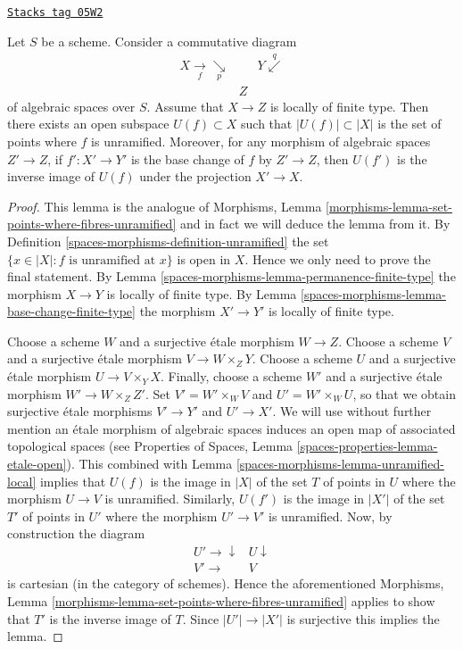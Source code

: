 \begin{lemma}
\label{spaces-morphisms-lemma-where-unramified}
\href{https://stacks.math.columbia.edu/tag/05W2}{\texttt{Stacks tag 05W2}}

Let $S$ be a scheme. Consider a commutative diagram
$$
\begin{array}{ccc}X \underset{f}{\longrightarrow}\underset{p}{\searrow} &  & Y \overset{q}{\swarrow} \\  & Z & \end{array}
$$
of algebraic spaces over $S$. Assume that $X \to Z$ is locally of
finite type. Then there exists an open subspace $U(f) \subset X$
such that $|U(f)| \subset |X|$ is the set of points where $f$ is unramified.
Moreover, for any morphism of algebraic spaces $Z' \to Z$, if
$f' : X' \to Y'$ is the base change of $f$ by $Z' \to Z$, then
$U(f')$ is the inverse image of $U(f)$ under the projection $X' \to X$.
\end{lemma}

\begin{proof}
This lemma is the analogue of
Morphisms, Lemma \ref{morphisms-lemma-set-points-where-fibres-unramified}
and in fact we will deduce the lemma from it. By
Definition \ref{spaces-morphisms-definition-unramified}
the set $\{x \in |X| : f \text{ is unramified at }x\}$ is
open in $X$. Hence we only need to prove the final statement. By
Lemma \ref{spaces-morphisms-lemma-permanence-finite-type}
the morphism $X \to Y$ is locally of finite type. By
Lemma \ref{spaces-morphisms-lemma-base-change-finite-type}
the morphism $X' \to Y'$ is locally of finite type.

\medskip\noindent
Choose a scheme $W$ and a surjective \'etale morphism $W \to Z$.
Choose a scheme $V$ and a surjective \'etale morphism $V \to W \times_Z Y$.
Choose a scheme $U$ and a surjective \'etale morphism $U \to V \times_Y X$.
Finally, choose a scheme $W'$ and a surjective \'etale morphism
$W' \to W \times_Z Z'$.
Set $V' = W' \times_W V$ and $U' = W' \times_W U$, so that we obtain
surjective \'etale morphisms $V' \to Y'$ and $U' \to X'$.
We will use without further mention an \'etale morphism of algebraic spaces
induces an open map of associated topological spaces (see
Properties of Spaces, Lemma
\ref{spaces-properties-lemma-etale-open}).
This combined with
Lemma \ref{spaces-morphisms-lemma-unramified-local}
implies that $U(f)$ is the image in $|X|$ of the set $T$ of points in $U$
where the morphism $U \to V$ is unramified. Similarly, $U(f')$ is the image
in $|X'|$ of the set $T'$ of points in $U'$ where the morphism $U' \to V'$
is unramified. Now, by construction the diagram
$$
\begin{array}{cc}U' \longrightarrow\downarrow & U \downarrow \\ V' \longrightarrow & V\end{array}
$$
is cartesian (in the category of schemes). Hence the aforementioned
Morphisms, Lemma \ref{morphisms-lemma-set-points-where-fibres-unramified}
applies to show that $T'$ is the inverse image of $T$. Since
$|U'| \to |X'|$ is surjective this implies the lemma.
\end{proof}

